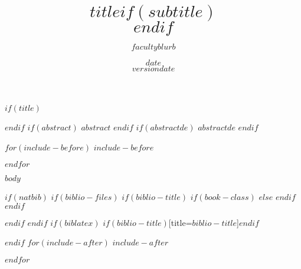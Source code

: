 \documentclass[$if(fontsize)$$fontsize$,$endif$$if(lang)$$lang$,$endif$$if(papersize)$$papersize$,$endif$$for(classoption)$$classoption$$sep$,$endfor$]{$documentclass$}
\title{$title$$if(subtitle)$\\\vspace{0.5em}{\large $subtitle$}$endif$}
\author{\parbox{\textwidth}{\normalsize\centering
  { $facultyblurb$ }}}
\date{$date$\\$version$}
\date{$date$}
\begin{document}
$if(title)$
\maketitle
$endif$
$if(abstract)$
$abstract$
$endif$
$if(abstractde)$
$abstractde$
$endif$

$for(include-before)$
$include-before$

$endfor$

\cleardoublepage
\tableofcontents
\newpage
\cleardoublepage
\listoffigures
\cleardoublepage
{}
\setcounter{page}{1}
\cleardoubleoddpage

$body$

$if(natbib)$
$if(biblio-files)$
$if(biblio-title)$
$if(book-class)$
\renewcommand\bibname{$biblio-title$}
$else$
\renewcommand\refname{$biblio-title$}
$endif$
$endif$


$endif$
$endif$
$if(biblatex)$
\printbibliography$if(biblio-title)$[title=$biblio-title$]$endif$

$endif$
$for(include-after)$
$include-after$

$endfor$
\end{document}

